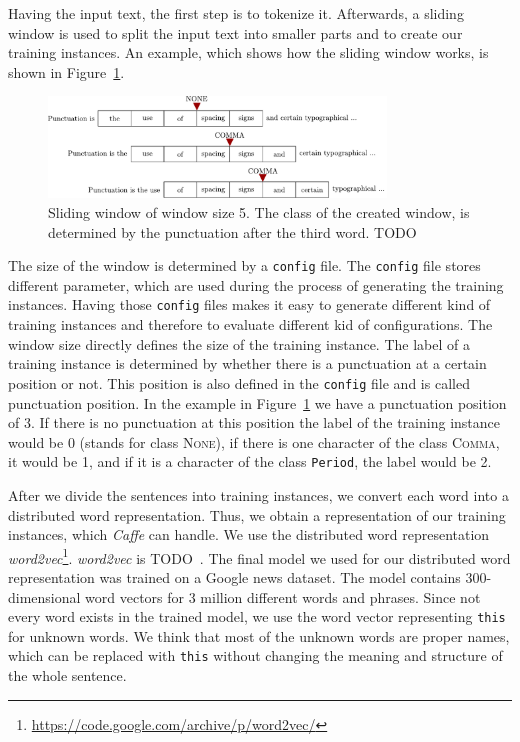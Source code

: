 Having the input text, the first step is to tokenize it.
Afterwards, a sliding window is used to split the input text into smaller parts and to create our training instances.
An example, which shows how the sliding window works, is shown in Figure~\ref{fig:sliding_window}.
\begin{figure}[ht]
    \centering
    \includegraphics[width=0.8\textwidth]{img/sliding_window.pdf}
    \caption{Sliding window of window size 5. The class of the created window, is determined by the punctuation after the third word. TODO}
    \label{fig:sliding_window}
\end{figure}
The size of the window is determined by a \texttt{config} file.
The \texttt{config} file stores different parameter, which are used during the process of generating the training instances.
Having those \texttt{config} files makes it easy to generate different kind of training instances and therefore to evaluate different kid of configurations.
The window size directly defines the size of the training instance.
The label of a training instance is determined by whether there is a punctuation at a certain position or not.
This position is also defined in the \texttt{config} file and is called punctuation position.
In the example in Figure~\ref{fig:sliding_window} we have a punctuation position of 3.
If there is no punctuation at this position the label of the training instance would be 0 (stands for class \textsc{None}), if there is one character of the class \textsc{Comma}, it would be 1, and if it is a character of the class \texttt{Period}, the label would be 2.

After we divide the sentences into training instances, we convert each word into a distributed word representation.
Thus, we obtain a representation of our training instances, which \emph{Caffe} can handle.
We use the distributed word representation \emph{word2vec}\footnote{\url{https://code.google.com/archive/p/word2vec/}}.
\emph{word2vec} is TODO~\cite{Mikolov1, Mikolov2, Mikolov3}.
The final model we used for our distributed word representation was trained on a Google news dataset.
The model contains 300-dimensional word vectors for 3 million different words and phrases.
Since not every word exists in the trained model, we use the word vector representing \texttt{this} for unknown words.
We think that most of the unknown words are proper names, which can be replaced with \texttt{this} without changing the meaning and structure of the whole sentence.

